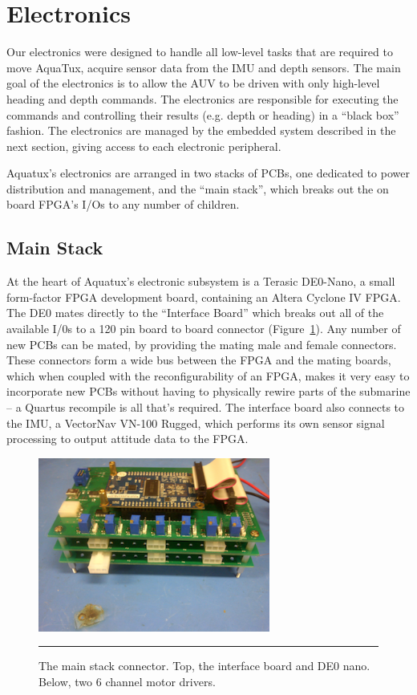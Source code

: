 
\section{Electronics}
Our electronics were designed to handle all low-level tasks that are
required to move AquaTux, acquire sensor data from the IMU and depth sensors. 
The main goal of the electronics is to allow the AUV to be driven with only
high-level heading and depth commands. The electronics are responsible for
executing the commands and controlling their results (e.g. depth or
heading) in a ``black box'' fashion. The electronics are managed by the embedded
system described in the next section, giving access to each electronic peripheral.

Aquatux's electronics are arranged in two stacks of PCBs, one dedicated to power 
distribution and management, and the ``main stack'', which breaks out the on board 
FPGA's I/Os to any number of children.

\subsection{Main Stack}
At the heart of Aquatux's electronic subsystem is a Terasic DE0-Nano, a small 
form-factor FPGA development board, containing an Altera Cyclone IV FPGA. The 
DE0 mates directly to the ``Interface Board'' which breaks out all of the 
available I/0s to a 120 pin board to board connector (Figure~\ref{mstack}). Any number of new PCBs 
can be mated, by providing the mating male and female connectors. These 
connectors form a wide bus between the FPGA and the mating boards, which when 
coupled with the reconfigurability of an FPGA, makes it very easy to incorporate 
new PCBs without having to physically rewire parts of the submarine -- a Quartus 
recompile is all that's required. The interface board also connects to the IMU, 
a VectorNav VN-100 Rugged, which performs its own sensor signal processing to 
output attitude data to the FPGA.

\begin{figure}
\begin{center}
 \includegraphics[width=3in]{fig/main_stack.png} %
\vspace{.05in}
\hrule
\caption{The main stack connector. Top, the interface board and DE0 nano. Below, two 6 channel motor drivers.}\label{mstack}
\end{center}
\end{figure}

